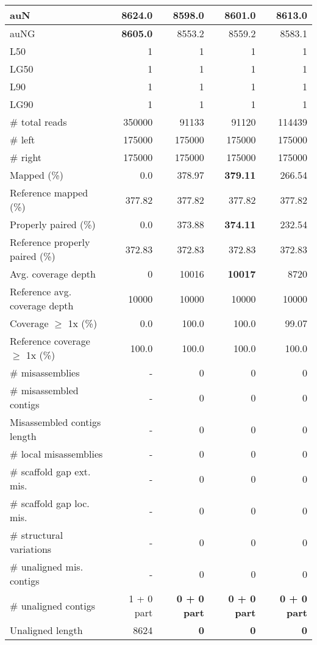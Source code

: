 \documentclass[12pt,a4paper]{article}
\begin{document}
\begin{table}[ht]
\begin{center}
\begin{tabular}{|l*{4}{|r}|}
auN & {\bf 8624.0} & 8598.0 & 8601.0 & 8613.0 \\ \hline
auNG & {\bf 8605.0} & 8553.2 & 8559.2 & 8583.1 \\ \hline
L50 & 1 & 1 & 1 & 1 \\ \hline
LG50 & 1 & 1 & 1 & 1 \\ \hline
L90 & 1 & 1 & 1 & 1 \\ \hline
LG90 & 1 & 1 & 1 & 1 \\ \hline
\# total reads & 350000 & 91133 & 91120 & 114439 \\ \hline
\# left & 175000 & 175000 & 175000 & 175000 \\ \hline
\# right & 175000 & 175000 & 175000 & 175000 \\ \hline
Mapped (\%) & 0.0 & 378.97 & {\bf 379.11} & 266.54 \\ \hline
Reference mapped (\%) & 377.82 & 377.82 & 377.82 & 377.82 \\ \hline
Properly paired (\%) & 0.0 & 373.88 & {\bf 374.11} & 232.54 \\ \hline
Reference properly paired (\%) & 372.83 & 372.83 & 372.83 & 372.83 \\ \hline
Avg. coverage depth & 0 & 10016 & {\bf 10017} & 8720 \\ \hline
Reference avg. coverage depth & 10000 & 10000 & 10000 & 10000 \\ \hline
Coverage $\geq$ 1x (\%) & 0.0 & 100.0 & 100.0 & 99.07 \\ \hline
Reference coverage $\geq$ 1x (\%) & 100.0 & 100.0 & 100.0 & 100.0 \\ \hline
\# misassemblies & - & 0 & 0 & 0 \\ \hline
\# misassembled contigs & - & 0 & 0 & 0 \\ \hline
Misassembled contigs length & - & 0 & 0 & 0 \\ \hline
\# local misassemblies & - & 0 & 0 & 0 \\ \hline
\# scaffold gap ext. mis. & - & 0 & 0 & 0 \\ \hline
\# scaffold gap loc. mis. & - & 0 & 0 & 0 \\ \hline
\# structural variations & - & 0 & 0 & 0 \\ \hline
\# unaligned mis. contigs & - & 0 & 0 & 0 \\ \hline
\# unaligned contigs & 1 + 0 part & {\bf 0 + 0 part} & {\bf 0 + 0 part} & {\bf 0 + 0 part} \\ \hline
Unaligned length & 8624 & {\bf 0} & {\bf 0} & {\bf 0} \\ \hline

\end{tabular}
\end{center}
\end{table}
\end{document}
